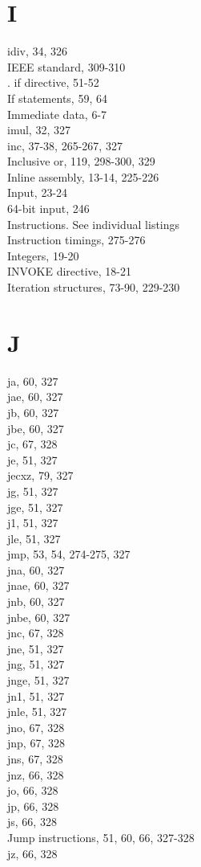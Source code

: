 \documentclass[10pt]{article}
\begin{document}
\section*{I}
idiv, 34, 326\\
IEEE standard, 309-310\\
. if directive, 51-52\\
If statements, 59, 64\\
Immediate data, 6-7\\
imul, 32, 327\\
inc, 37-38, 265-267, 327\\
Inclusive or, 119, 298-300, 329\\
Inline assembly, 13-14, 225-226\\
Input, 23-24\\
64-bit input, 246\\
Instructions. See individual listings\\
Instruction timings, 275-276\\
Integers, 19-20\\
INVOKE directive, 18-21\\
Iteration structures, 73-90, 229-230

\section*{J}
ja, 60, 327\\
jae, 60, 327\\
jb, 60, 327\\
jbe, 60, 327\\
jc, 67, 328\\
je, 51, 327\\
jecxz, 79, 327\\
jg, 51, 327\\
jge, 51, 327\\
j1, 51, 327\\
jle, 51, 327\\
jmp, 53, 54, 274-275, 327\\
jna, 60, 327\\
jnae, 60, 327\\
jnb, 60, 327\\
jnbe, 60, 327\\
jnc, 67, 328\\
jne, 51, 327\\
jng, 51, 327\\
jnge, 51, 327\\
jn1, 51, 327\\
jnle, 51, 327\\
jno, 67, 328\\
jnp, 67, 328\\
jns, 67, 328\\
jnz, 66, 328\\
jo, 66, 328\\
jp, 66, 328\\
js, 66, 328\\
Jump instructions, 51, 60, 66, 327-328\\
jz, 66, 328
\end{document}
